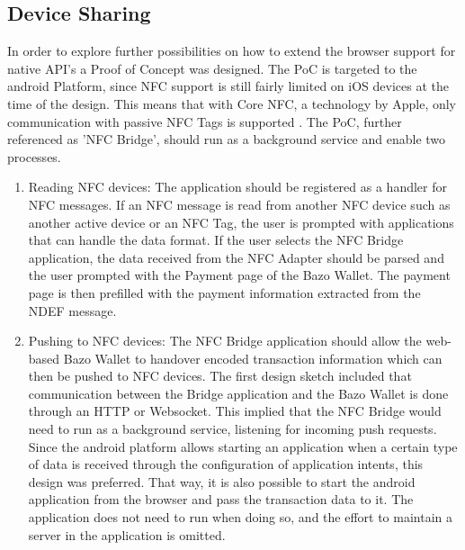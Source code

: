 \subsection{Device Sharing}\label{pocnfcbridge}
In order to explore further possibilities on how to extend the browser support for native API's a Proof of Concept was designed. The PoC is targeted to the android Platform, since NFC support is still fairly limited on iOS devices at the time of the design. This means that with Core NFC, a technology by Apple, only communication with passive NFC Tags is supported \cite{corenfc}. The PoC, further referenced as 'NFC Bridge', should run as a background service and enable two processes.
\begin{enumerate}
\item Reading NFC devices:
The application should be registered as a handler for NFC messages. If an NFC message is read from another NFC device such as another active device or an NFC Tag, the user is prompted with applications that can handle the data format. If the user selects the NFC Bridge application, the data received from the NFC Adapter should be parsed and the user prompted with the Payment page of the Bazo Wallet. The payment page is then prefilled with the payment information extracted from the NDEF message.
\item Pushing to NFC devices: The NFC Bridge application should allow the web-based Bazo Wallet to handover encoded transaction information which can then be pushed to NFC devices.
The first design sketch included that communication between the Bridge application and the Bazo Wallet is done through an HTTP or Websocket. This implied that the NFC Bridge would need to run as a background service, listening for incoming push requests.
Since the android platform allows starting an application when a certain type of data is received through the configuration of application intents, this design was preferred. That way, it is also possible to start the android application from the browser and pass the transaction data to it. The application does not need to run when doing so, and the effort to maintain a server in the application is omitted.
\end{enumerate}

